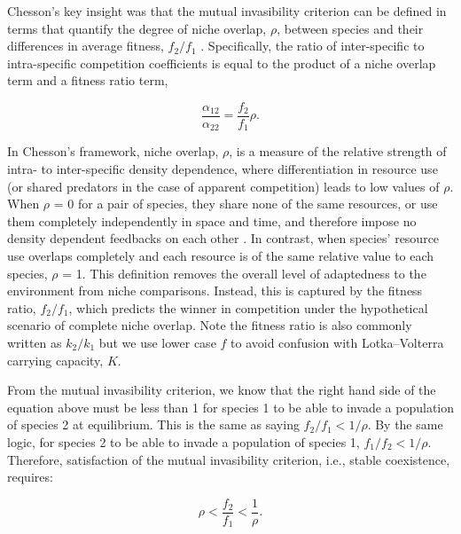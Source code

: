 Chesson's key insight was that the mutual invasibility criterion can be defined in terms that quantify the degree of niche overlap, $\rho$, between species and their differences in average fitness, $f_{2}/f_{1}$ \citep{Chesson2000}. Specifically, the ratio of inter-specific to intra-specific competition coefficients is equal to the product of a niche overlap term and a fitness ratio term,

\begin{equation}
\frac{\alpha_{12}}{\alpha_{22}} = \frac{f_{2}}{f_{1}} \rho. 
\tag{2.2}\label{eq:2.2}
\end{equation}

\noindent In Chesson's framework, niche overlap, $\rho$, is a measure of the relative strength of intra- to inter-specific density dependence, where differentiation in resource use (or shared predators in the case of apparent competition) leads to low values of $\rho$. When $\rho$ = 0 for a pair of species, they share none of the same resources, or use them completely independently in space and time, and therefore impose no density dependent feedbacks on each other \citep{Chesson2000, Chesson2008}. In contrast, when species' resource use overlaps completely and each resource is of the same relative value to each species, $\rho$ = 1. This definition removes the overall level of adaptedness to the environment from niche comparisons. Instead, this is captured by the fitness ratio, $f_{2}/f_{1}$, which predicts the winner in competition under the hypothetical scenario of complete niche overlap. Note the fitness ratio is also commonly written as $k_{2}/k_{1}$ but we use lower case $f$ to avoid confusion with Lotka--Volterra carrying capacity, $K$.
\par


From the mutual invasibility criterion, we know that the right hand side of the equation above must be less than 1 for species 1 to be able to invade a population of species 2 at equilibrium. This is the same as saying $f_{2}/f_{1} < 1/\rho$. By the same logic, for species 2 to be able to invade a population of species 1, $f_{1}/f_{2} < 1/\rho$. Therefore, satisfaction of the mutual invasibility criterion, i.e., stable coexistence, requires:

\begin{equation}
\rho < \frac{f_{2}}{f_{1}} < \frac{1}{\rho}. 
\tag{2.3}\label{eq:2.3}
\end{equation}

